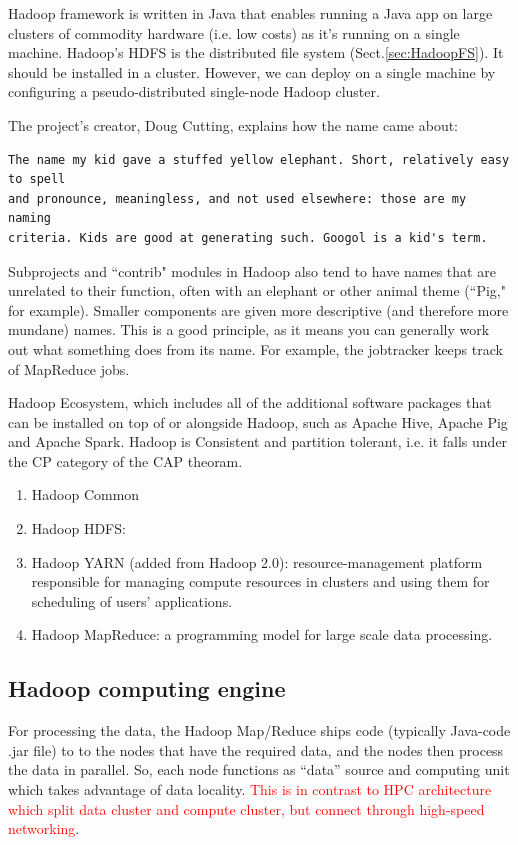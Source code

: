 Hadoop framework is written in Java that enables running a Java app on large
clusters of commodity hardware (i.e. low costs) as it's running on a single
machine. Hadoop's HDFS is the distributed file system (Sect.\ref{sec:HadoopFS}).
It should be installed in a cluster. However, we can deploy on a single machine
by configuring a pseudo-distributed single-node Hadoop cluster.

The project's creator, Doug Cutting, explains how the name came about:
\begin{verbatim}
The name my kid gave a stuffed yellow elephant. Short, relatively easy to spell
and pronounce, meaningless, and not used elsewhere: those are my naming
criteria. Kids are good at generating such. Googol is a kid's term.  
\end{verbatim} 
Subprojects and ``contrib" modules in Hadoop also tend to have names that are
unrelated to their function, often with an elephant or other animal theme
(``Pig," for example). Smaller components are given more descriptive (and
therefore more mundane) names. This is a good principle, as it means you can
generally work out what something does from its name. For example, the
jobtracker keeps track of MapReduce jobs.    

Hadoop Ecosystem, which includes all of the additional software packages that
can be installed on top of or alongside Hadoop, such as Apache Hive, Apache Pig
and Apache Spark. Hadoop is Consistent and partition tolerant, i.e. it falls
under the CP category of the CAP theoram.
\begin{enumerate}
  \item Hadoop Common
  \item Hadoop HDFS:
  \item Hadoop YARN (added from Hadoop 2.0):  resource-management platform
  responsible for managing compute resources in clusters and using them for scheduling of users' applications.
  \item Hadoop MapReduce: a programming model for large scale data processing.
\end{enumerate}

\subsection{Hadoop computing engine}
\label{sec:hadoop_node_structure}

For processing the data, the Hadoop Map/Reduce ships code (typically Java-code
.jar file) to to the nodes that have the required data, and the nodes then
process the data in parallel. So, each node functions as ``data'' source and
computing unit which takes advantage of data locality. \textcolor{red}{This is
in contrast to HPC architecture which split data cluster and compute cluster,
but connect through high-speed networking}. 

